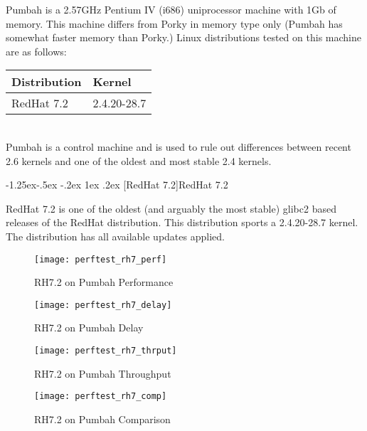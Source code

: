 \documentclass[letterpaper,final,notitlepage,twocolumn,10pt,twoside]{article}
\makeatletter
\renewcommand\subsubsection{\@startsection{subsubsection}{3}{\z@}%
                                     {-1.25ex\@plus -.5ex \@minus -.2ex}%
                                     {1ex \@plus .2ex}%
                                     {\normalfont\normalsize\bfseries}}
\makeatother
\begin{document}
Pumbah is a 2.57GHz Pentium IV (i686) uniprocessor machine with 1Gb of memory.
This machine differs from Porky in memory type only (Pumbah has somewhat
faster memory than Porky.) Linux distributions tested on this machine are as
follows:

\begin{tabular}{ll}\\
Distribution & Kernel\\
\hline
RedHat 7.2 & 2.4.20-28.7\\
\end{tabular}\\[1.0ex]

Pumbah is a control machine and is used to rule out differences between recent
2.6 kernels and one of the oldest and most stable 2.4 kernels.

\subsubsection[RedHat 7.2]{RedHat 7.2}

RedHat 7.2 is one of the oldest (and arguably the most stable) glibc2 based
releases of the RedHat distribution.  This distribution sports a 2.4.20-28.7
kernel.  The distribution has all available updates applied.

\begin{figure}[p]
\texttt{[image: perftest\_rh7\_perf]}
\caption[RH7.2 on Pumbah Performance]{RH7.2 on Pumbah Performance}
\label{figure:rh7perf}
\end{figure}

\begin{figure}[p]
\texttt{[image: perftest\_rh7\_delay]}
\caption[RH7.2 on Pumbah Delay]{RH7.2 on Pumbah Delay}
\label{figure:rh7delay}
\end{figure}

\begin{figure}[p]
\texttt{[image: perftest\_rh7\_thrput]}
\caption[RH7.2 on Pumbah Throughput]{RH7.2 on Pumbah Throughput}
\label{figure:rh7thrput}
\end{figure}

\begin{figure}[p]
\texttt{[image: perftest\_rh7\_comp]}
\caption[RH7.2 on Pumbah Comparison]{RH7.2 on Pumbah Comparison}
\label{figure:rh7comp}
\end{figure}
\end{document}
